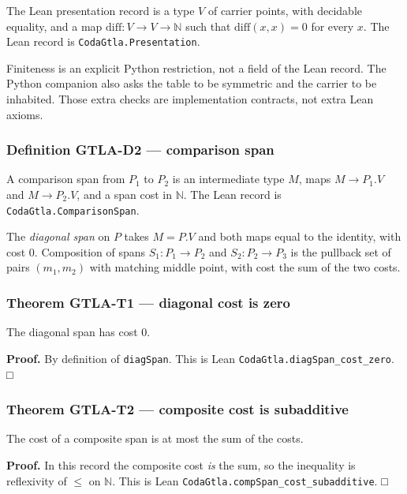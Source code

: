 \documentclass[
  11pt,
]{article}
\begin{document}
The Lean presentation record is a type \(V\) of carrier points, with decidable equality, and a map \(\mathrm{diff}:V\to V\to\mathbb{N}\) such that \(\mathrm{diff}(x,x)=0\) for every \(x\). The Lean record is \nolinkurl{CodaGtla.Presentation}.

Finiteness is an explicit Python restriction, not a field of the Lean record. The Python companion also asks the table to be symmetric and the carrier to be inhabited. Those extra checks are implementation contracts, not extra Lean axioms.

\subsubsection{Definition GTLA-D2 --- comparison span}\label{definition-gtla-d2-comparison-span}

A comparison span from \(P_1\) to \(P_2\) is an intermediate type \(M\), maps \(M\to P_1.V\) and \(M\to P_2.V\), and a span cost in \(\mathbb{N}\). The Lean record is \nolinkurl{CodaGtla.ComparisonSpan}.

The \emph{diagonal span} on \(P\) takes \(M=P.V\) and both maps equal to the identity, with cost \(0\). Composition of spans \(S_1:P_1\to P_2\) and \(S_2:P_2\to P_3\) is the pullback set of pairs \((m_1,m_2)\) with matching middle point, with cost the sum of the two costs.

\subsubsection{Theorem GTLA-T1 --- diagonal cost is zero}\label{theorem-gtla-t1-diagonal-cost-is-zero}

The diagonal span has cost \(0\).

\textbf{Proof.} By definition of \texttt{diagSpan}. This is Lean \nolinkurl{CodaGtla.diagSpan_cost_zero}. □

\subsubsection{Theorem GTLA-T2 --- composite cost is subadditive}\label{theorem-gtla-t2-composite-cost-is-subadditive}

The cost of a composite span is at most the sum of the costs.

\textbf{Proof.} In this record the composite cost \emph{is} the sum, so the inequality is reflexivity of \(\le\) on \(\mathbb{N}\). This is Lean \nolinkurl{CodaGtla.compSpan_cost_subadditive}. □
\end{document}
